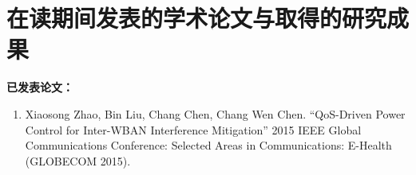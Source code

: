 ﻿
\chapter{在读期间发表的学术论文与取得的研究成果}



\noindent\textbf{已发表论文：}

\begin{enumerate}

\item Xiaosong Zhao, Bin Liu, Chang Chen, Chang Wen Chen. “QoS-Driven Power Control for Inter-WBAN Interference Mitigation” 2015 IEEE Global Communications Conference: Selected Areas in Communications: E-Health (GLOBECOM 2015).
\end{enumerate}

\vskip 1cm

